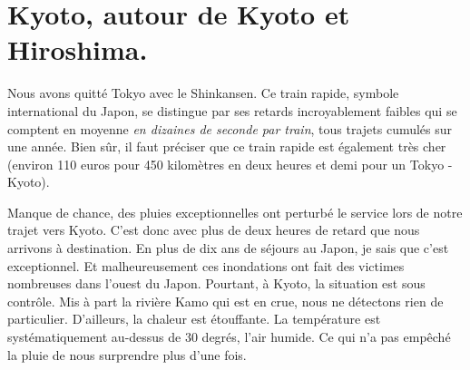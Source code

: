 \hypertarget{kyoto-autour-de-kyoto-et-hiroshima.}{%
\section{Kyoto, autour de Kyoto et
Hiroshima.}\label{kyoto-autour-de-kyoto-et-hiroshima.}}

Nous avons quitté Tokyo avec le Shinkansen. Ce train rapide, symbole
international du Japon, se distingue par ses retards incroyablement
faibles qui se comptent en moyenne \emph{en dizaines de seconde par
train}, tous trajets cumulés sur une année. Bien sûr, il faut préciser
que ce train rapide est également très cher (environ 110 euros pour 450
kilomètres en deux heures et demi pour un Tokyo - Kyoto).

Manque de chance, des pluies exceptionnelles ont perturbé le service
lors de notre trajet vers Kyoto. C'est donc avec plus de deux heures de
retard que nous arrivons à destination. En plus de dix ans de séjours au
Japon, je sais que c'est exceptionnel. Et malheureusement ces
inondations ont fait des victimes nombreuses dans l'ouest du Japon.
Pourtant, à Kyoto, la situation est sous contrôle. Mis à part la rivière
Kamo qui est en crue, nous ne détectons rien de particulier. D'ailleurs,
la chaleur est étouffante. La température est systématiquement au-dessus
de 30 degrés, l'air humide. Ce qui n'a pas empêché la pluie de nous
surprendre plus d'une fois.

